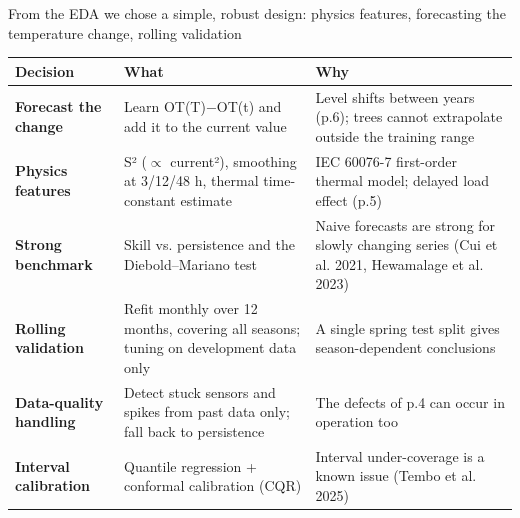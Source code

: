 \documentclass[aspectratio=169,10pt]{beamer}
\begin{document}
\begin{frame}{From the EDA we chose a simple, robust design: physics features, forecasting the temperature change, rolling validation}
  \scriptsize
  \renewcommand{\arraystretch}{1.25}
  \begin{tabularx}{\textwidth}{>{\bfseries}p{3.0cm} X X}
    \toprule
    Decision & What & Why \\
    \midrule
    Forecast the change & Learn OT(T)−OT(t) and add it to the current value & Level shifts between years (p.6); trees cannot extrapolate outside the training range \\
    Physics features & S² ($\propto$ current²), smoothing at 3/12/48 h, thermal time-constant estimate & IEC 60076-7 first-order thermal model; delayed load effect (p.5) \\
    Strong benchmark & Skill vs. persistence and the Diebold--Mariano test & Naive forecasts are strong for slowly changing series (Cui et al. 2021, Hewamalage et al. 2023) \\
    Rolling validation & Refit monthly over 12 months, covering all seasons; tuning on development data only & A single spring test split gives season-dependent conclusions \\
    Data-quality handling & Detect stuck sensors and spikes from past data only; fall back to persistence & The defects of p.4 can occur in operation too \\
    Interval calibration & Quantile regression + conformal calibration (CQR) & Interval under-coverage is a known issue (Tembo et al. 2025) \\
    \bottomrule
  \end{tabularx}
\end{frame}
\end{document}
